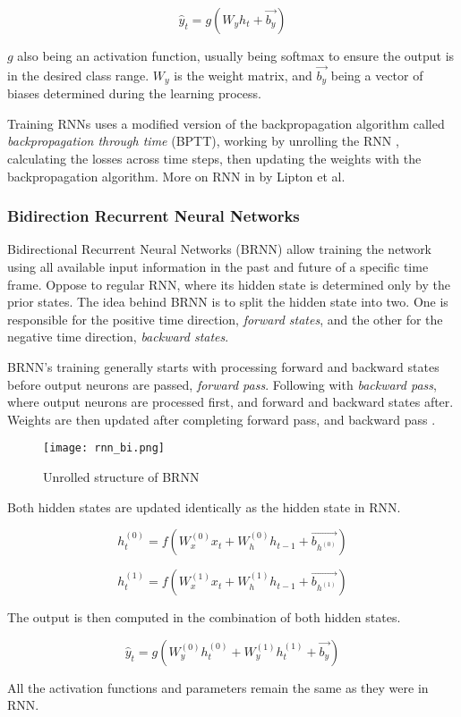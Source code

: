 \begin{equation}
    {\hat{y}_t = g(W_{y}h_t + \vec{b_y})}
\end{equation}

$g$ also being an activation function, usually being softmax to ensure the output is in the desired class range. $W_y$ is the weight matrix, and $\vec{b_y}$ being a vector of biases determined during the learning process.

Training RNNs uses a modified version of the backpropagation algorithm called \textit{backpropagation through time} (BPTT), working by unrolling the RNN \cite{Goodfellow-et-al-2016}, calculating the losses across time steps, then updating the weights with the backpropagation algorithm. More on RNN in \cite{lipton2015critical} by Lipton et al.


\subsubsection{Bidirection Recurrent Neural Networks}


Bidirectional Recurrent Neural Networks (BRNN) allow training the network using all available input information in the past and future of a specific time frame. Oppose to regular RNN, where its hidden state is determined only by the prior states. The idea behind BRNN is to split the hidden state into two. One is responsible for the positive time direction, \textit{forward states}, and the other for the negative time direction, \textit{backward states}.

BRNN’s training generally starts with processing forward and backward states before output neurons are passed, \textit{forward pass}. Following with \textit{backward pass}, where output neurons are processed first, and forward and backward states after. Weights are then updated after completing forward pass, and backward pass \cite{schusterbdrnn}.

\begin{figure}[h]
    \centering
    \texttt{[image: rnn\_bi.png]}
    \caption{Unrolled structure of BRNN \cite{matous}}
    \label{fig:brnn}
\end{figure}


Both hidden states are updated identically as the hidden state in RNN.

\begin{equation}
    {h_t^{(0)} = f(W_{x}^{(0)}x_t + W_{h}^{(0)}h_{t-1}+\vec{b_{h^{(0)}}})}
\end{equation}

\begin{equation}
    {h_t^{(1)} = f(W_{x}^{(1)}x_t + W_{h}^{(1)}h_{t-1}+\vec{b_{h^{(1)}}})}
\end{equation}

The output is then computed in the combination of both hidden states.

\begin{equation}
    {\hat{y}_t = g(W_{y}^{(0)}h_t^{(0)} + W_{y}^{(1)}h_t^{(1)} + \vec{b_y})}
\end{equation}

All the activation functions and parameters remain the same as they were in RNN. 
